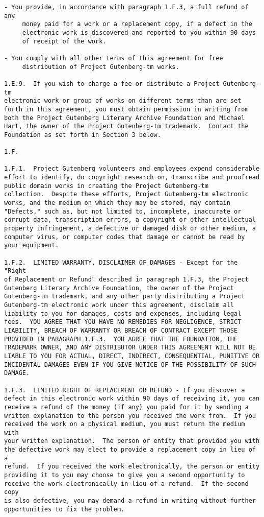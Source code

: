 \begin{Verbatim}[fontsize=\footnotesize]
- You provide, in accordance with paragraph 1.F.3, a full refund of any
     money paid for a work or a replacement copy, if a defect in the
     electronic work is discovered and reported to you within 90 days
     of receipt of the work.

- You comply with all other terms of this agreement for free
     distribution of Project Gutenberg-tm works.

1.E.9.  If you wish to charge a fee or distribute a Project Gutenberg-tm
electronic work or group of works on different terms than are set
forth in this agreement, you must obtain permission in writing from
both the Project Gutenberg Literary Archive Foundation and Michael
Hart, the owner of the Project Gutenberg-tm trademark.  Contact the
Foundation as set forth in Section 3 below.

1.F.

1.F.1.  Project Gutenberg volunteers and employees expend considerable
effort to identify, do copyright research on, transcribe and proofread
public domain works in creating the Project Gutenberg-tm
collection.  Despite these efforts, Project Gutenberg-tm electronic
works, and the medium on which they may be stored, may contain
"Defects," such as, but not limited to, incomplete, inaccurate or
corrupt data, transcription errors, a copyright or other intellectual
property infringement, a defective or damaged disk or other medium, a
computer virus, or computer codes that damage or cannot be read by
your equipment.

1.F.2.  LIMITED WARRANTY, DISCLAIMER OF DAMAGES - Except for the "Right
of Replacement or Refund" described in paragraph 1.F.3, the Project
Gutenberg Literary Archive Foundation, the owner of the Project
Gutenberg-tm trademark, and any other party distributing a Project
Gutenberg-tm electronic work under this agreement, disclaim all
liability to you for damages, costs and expenses, including legal
fees.  YOU AGREE THAT YOU HAVE NO REMEDIES FOR NEGLIGENCE, STRICT
LIABILITY, BREACH OF WARRANTY OR BREACH OF CONTRACT EXCEPT THOSE
PROVIDED IN PARAGRAPH 1.F.3.  YOU AGREE THAT THE FOUNDATION, THE
TRADEMARK OWNER, AND ANY DISTRIBUTOR UNDER THIS AGREEMENT WILL NOT BE
LIABLE TO YOU FOR ACTUAL, DIRECT, INDIRECT, CONSEQUENTIAL, PUNITIVE OR
INCIDENTAL DAMAGES EVEN IF YOU GIVE NOTICE OF THE POSSIBILITY OF SUCH
DAMAGE.

1.F.3.  LIMITED RIGHT OF REPLACEMENT OR REFUND - If you discover a
defect in this electronic work within 90 days of receiving it, you can
receive a refund of the money (if any) you paid for it by sending a
written explanation to the person you received the work from.  If you
received the work on a physical medium, you must return the medium with
your written explanation.  The person or entity that provided you with
the defective work may elect to provide a replacement copy in lieu of a
refund.  If you received the work electronically, the person or entity
providing it to you may choose to give you a second opportunity to
receive the work electronically in lieu of a refund.  If the second copy
is also defective, you may demand a refund in writing without further
opportunities to fix the problem.


\end{Verbatim}
